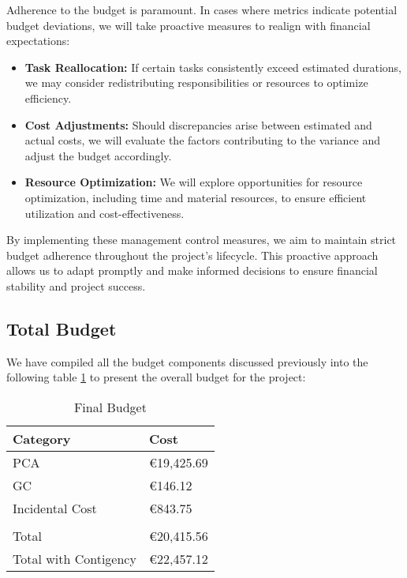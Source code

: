 Adherence to the budget is paramount. In cases where metrics indicate potential budget deviations, we will take proactive measures to realign with financial expectations:

\begin{itemize}
    \item \textbf{Task Reallocation:} If certain tasks consistently exceed estimated durations, we may consider redistributing responsibilities or resources to optimize efficiency.
    
    \item \textbf{Cost Adjustments:} Should discrepancies arise between estimated and actual costs, we will evaluate the factors contributing to the variance and adjust the budget accordingly.
    
    \item \textbf{Resource Optimization:} We will explore opportunities for resource optimization, including time and material resources, to ensure efficient utilization and cost-effectiveness.
\end{itemize}

By implementing these management control measures, we aim to maintain strict budget adherence throughout the project's lifecycle. This proactive approach allows us to adapt promptly and make informed decisions to ensure financial stability and project success.

\subsection{Total Budget}
We have compiled all the budget components discussed previously into the following table \ref{tab:finalBudget} to present the overall budget for the project:
\begin{table}[!ht]
    \centering
    \begin{tabular}{|l|l|}
    \hline
    \rowcolor{black!25}
        Category & Cost\\ \hline
        PCA & €19,425.69 \\ \hline
        GC & €146.12 \\ \hline
        Incidental Cost & €843.75 \\ \hline
        \multicolumn{2}{c}{}\\ \hline
        \cellcolor{black!15}
        Total & €20,415.56 \\ \hline
        \cellcolor{black!25}
        Total with Contigency & €22,457.12 \\ \hline
    \end{tabular}
    \caption{Final Budget}
    \label{tab:finalBudget}
\end{table}

